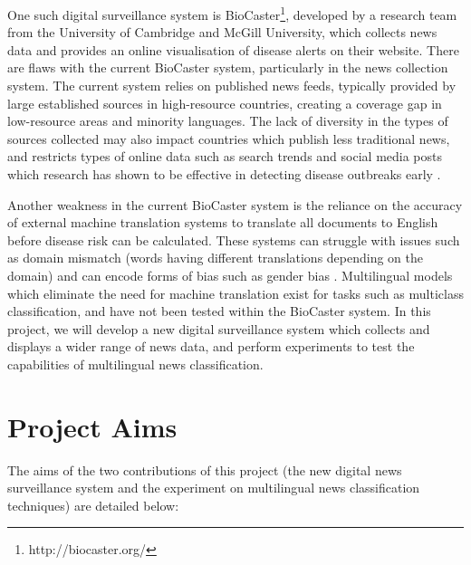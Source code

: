 \documentclass{l4proj}
\begin{document}
One such digital surveillance system is BioCaster\footnote{http://biocaster.org/}, developed by a research team from the University of Cambridge and McGill University, which collects news data and provides an online visualisation of disease alerts on their website. There are flaws with the current BioCaster system, particularly in the news collection system. The current system relies on published news feeds, typically provided by large established sources in high-resource countries, creating a coverage gap in low-resource areas and minority languages. The lack of diversity in the types of sources collected may also impact countries which publish less traditional news, and restricts types of online data such as search trends and social media posts which research has shown to be effective in detecting disease outbreaks early \citep{seo2017methods}. \par
Another weakness in the current BioCaster system is the reliance on the accuracy of external machine translation systems to translate all documents to English before disease risk can be calculated. These systems can struggle with issues such as domain mismatch (words having different translations depending on the domain) \citep{koehn2017six} and can encode forms of bias such as gender bias \citep{stanovsky2019evaluating}. Multilingual models which eliminate the need for machine translation exist for tasks such as multiclass classification, and have not been tested within the BioCaster system. In this project, we will develop a new digital surveillance system which collects and displays a wider range of news data, and perform experiments to test the capabilities of multilingual news classification.

\section{Project Aims}
The aims of the two contributions of this project (the new digital news surveillance system and the experiment on multilingual news classification techniques) are detailed below:
\end{document}
